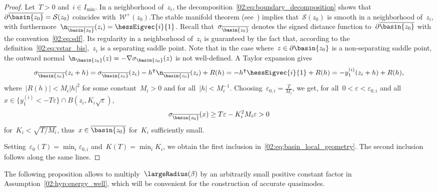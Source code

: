             \begin{proof}
                Let~$T>0$ and~$i\in I_{\min}$. In a neighborhood of~$z_i$, the decomposition~\eqref{02:eq:boundary_decomposition} shows that~$\partial \overline{\basin{z_0}} = \mathcal S(z_0)$ coincides with~$\mathcal W^{+}(z_0)$.The stable manifold theorem (see~\cite[Section 9.2]{T00}) implies that~$\mathcal S(z_0)$ is smooth in a neighborhood of~$z_i$, with furthermore~$\n_{\overline{\basin{z_0}}}(z_i) = \hessEigvec{i}{1}$.
                Recall that~$\sigma_{\overline{\basin{z_0}}}$ denotes the signed distance function to~$\partial\overline{\basin{z_0}}$ with the convention~\eqref{02:eq:sdf}. Its regularity in a neighborhood of~$z_i$ is guaranteed by the fact that, according to the definition~\eqref{02:eq:vstar_bis},~$z_i$ is a separating saddle point.
                Note that in the case where~$z\in\partial \basin{z_0}$ is a non-separating saddle point, the outward normal~$\n_{\basin{z_0}}(z) = -\nabla \sigma_{\basin{z_0}}(z)$ is not well-defined.
                A Taylor expansion gives
                \[\sigma_{\overline{\basin{z_0}}}(z_i+h) = \sigma_{\overline{\basin{z_0}}}(z_i) -h^\intercal\n_{\overline{\basin{z_0}}}(z_i) + R(h) = -h^\intercal\hessEigvec{i}{1} + R(h) = -y_1^{(i)}(z_i+h)+R(h),\]
                where~$|R(h)| < M_i|h|^2$ for some constant~$M_i>0$ and for all~$|h| < M_i^{-1}$. 
                Choosing~$\varepsilon_{0,i}=\frac{T}{M_i}$, we get, for all~$0<\varepsilon<\varepsilon_{0,i}$ and all~$x\in\{y_1^{(i)} < -T\varepsilon\}\cap B(z_i,K_i\sqrt\varepsilon)$,
                \begin{equation}
                    \sigma_{\overline{\basin{z_0}}}(x) \geq T\varepsilon - K_i^2M_i\varepsilon > 0
                \end{equation}
                for~$K_i<\sqrt{T/M_i}$, thus~$x\in\overline{\basin{z_0}}$ for~$K_i$ sufficiently small.
                
                Setting~$\varepsilon_0(T)=\min_i\varepsilon_{0,i}$ and~$K(T) =\min_i K_i$, we obtain the first inclusion in~\eqref{02:eq:basin_local_geometry}.
                 The second inclusion follows along the same lines.
            \end{proof}
            The following proposition allows to multiply~$\largeRadius(\beta)$ by an arbitrarily small positive constant factor in Assumption~\eqref{02:hyp:energy_well}, which will be convenient for the construction of accurate quasimodes.
